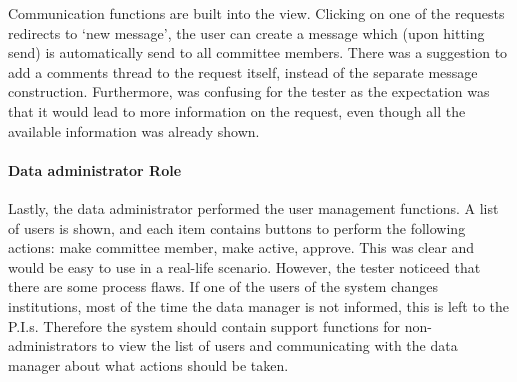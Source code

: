 
Communication functions are built into the view.  
Clicking on one of the requests redirects to `new message', the user can create a message which (upon hitting send) is automatically send to all committee members.
There was a suggestion to add a comments thread to the request itself, instead of the separate message construction.
Furthermore,  was confusing for the tester as the expectation was that it would lead to more information on the request, even though all the available information was already shown. 

\paragraph{Data administrator Role}
Lastly, the data administrator performed the user management functions.
A list of users is shown, and each item contains buttons to perform the following actions: make committee member, make active, approve.
This was clear and would be easy to use in a real-life scenario.
However, the tester noticeed that there are some process flaws.
If one of the users of the system changes institutions, most of the time the data manager is not informed, this is left to the P.I.s.
Therefore the system should contain support functions for non-administrators to view the list of users and communicating with the data manager about what actions should be taken.

